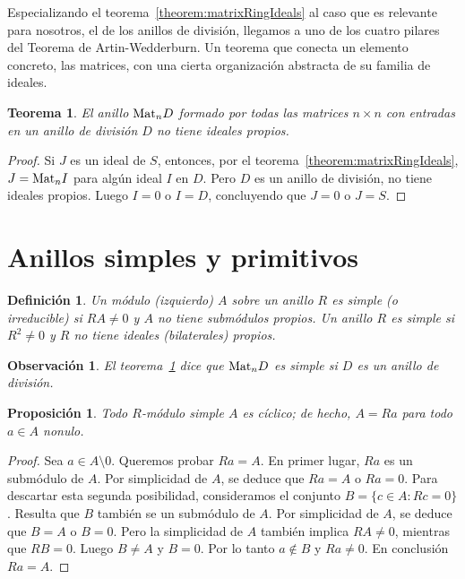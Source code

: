 \documentclass{report}
\newcommand{\Mat}{\textnormal{Mat}}
\newtheorem{theorem}{Teorema}
\newtheorem{proposition}{Proposición}
\newtheorem{definition}{Definición}
\newtheorem{remark}{Observación}
\begin{document}
  Especializando el teorema~\ref{theorem:matrixRingIdeals} al caso que es relevante para nosotros, el de los anillos de división, llegamos a uno de los cuatro pilares del Teorema de Artin-Wedderburn.
  Un teorema que conecta un elemento concreto, las matrices, con una cierta organización abstracta de su familia de ideales.

  \begin{theorem}\label{theorem:idealsInTheRingOfMatricesOverADivisionRing}
    El anillo \(\Mat_n D\) formado por todas las matrices \(n \times n\) con entradas en un anillo de división \(D\) no tiene ideales propios.
  \end{theorem}
  \begin{proof}
    Si \(J\) es un ideal de \(S\), entonces, por el teorema~\ref{theorem:matrixRingIdeals}, \(J = \Mat_n I\) para algún ideal \(I\) en \(D\).
    Pero \(D\) es un anillo de división, no tiene ideales propios.
    Luego \(I = 0\) o \(I = D\), concluyendo que \(J = 0\) o \(J = S\).
  \end{proof}

  \section{Anillos simples y primitivos}

  \begin{definition}
    Un módulo (izquierdo) \(A\) sobre un anillo \(R\) es \emph{simple} (o \emph{irreducible}) si \(R A \neq 0\) y \(A\) no tiene submódulos propios.
    Un anillo \(R\) es \emph{simple} si \(R^2 \neq 0\) y \(R\) no tiene ideales (bilaterales) propios.
  \end{definition}

  \begin{remark}
    El teorema~\ref{theorem:idealsInTheRingOfMatricesOverADivisionRing} dice que \(\Mat_n D\) es simple si \(D\) es un anillo de división.
  \end{remark}

  \begin{proposition}\label{proposition:simpleModulesAreCiclic}
    Todo \(R\)-módulo simple \(A\) es cíclico; de hecho, \(A = R a\) para todo \(a \in A\) nonulo.
  \end{proposition}
  \begin{proof}
    Sea \(a \in A \setminus 0\).
    Queremos probar \(R a = A\).
    En primer lugar, \(R a\) es un submódulo de \(A\).
    Por simplicidad de \(A\), se deduce que \(R a = A\) o \(R a = 0\).
    Para descartar esta segunda posibilidad, consideramos el conjunto \(B = \{c \in A : R c = 0\}\).
    Resulta que \(B\) también se un submódulo de \(A\).
    Por simplicidad de \(A\), se deduce que \(B = A\) o \(B = 0\).
    Pero la simplicidad de \(A\) también implica \(R A \neq 0\), mientras que \(R B = 0\).
    Luego \(B \neq A\) y \(B = 0\).
    Por lo tanto \(a \notin B\) y \(R a \neq 0\).
    En conclusión \(R a = A\).
  \end{proof}
\end{document}
